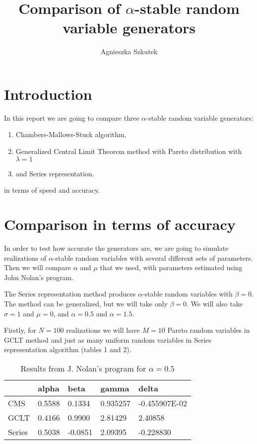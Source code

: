 \documentclass[12pt,titlepage]{article}
\title{Comparison of $\alpha$-stable random variable generators}
\author{Agnieszka Szkutek}
\date{\parbox{\linewidth}{\centering%
  May 2017
  \endgraf\bigskip\endgraf\bigskip
  \endgraf\bigskip\endgraf\bigskip
  \endgraf\bigskip\endgraf\bigskip
  \endgraf\bigskip\endgraf\bigskip
  \endgraf\bigskip\endgraf\bigskip
  \endgraf\bigskip\endgraf\bigskip
  \endgraf\bigskip\endgraf\bigskip
  \endgraf\bigskip\endgraf\bigskip
  \endgraf\bigskip\endgraf\bigskip
  Wroclaw University of Science and Technology
  }}
\begin{document}
\maketitle

\section{Introduction}

In this report we are going to compare three $\alpha$-stable random variable generators:
\begin{enumerate}
	\item Chambers-Mallows-Stuck algorithm,
	\item Generalized Central Limit Theorem method with Pareto distribution with $\lambda=1$
	\item and Series representation.
\end{enumerate}
in terms of speed and accuracy.



\section{Comparison in terms of accuracy}
In order to test how accurate the generators are, we are going to simulate realizations of $\alpha$-stable random variables with several different sets of parameters. Then we will compare $\alpha$ and $\mu$ that we used, with parameters estimated using John Nolan's program.

The Series representation method produces $\alpha$-stable random variables with $\beta = 0$. The method can be generalized, but we will take only $\beta=0$.
We will also take $\sigma = 1$ and $\mu=0$, and $\alpha=0.5$ and $\alpha=1.5$.

Firstly, for $N=100$ realizations we will have $M=10$ Pareto random variables in GCLT method and just as many uniform random variables in Series representation algorithm (tables 1 and 2).

\begin{table}[h]
\footnotesize
\centering
\caption{Results from J. Nolan's program for $\alpha=0.5$ }
\begin{tabular}{l|llll}
     & alpha  & beta   & gamma    & delta         \\ \hline
CMS & 0.5588 & 0.1334 & 0.935257 & -0.455907E-02 \\
GCLT &   0.4166 & 0.9900  &  2.81429 & 2.40858   \\
Series & 0.5038 & -0.0851  &  2.09395   &   -0.228830
\end{tabular}
\end{table}
\end{document}
